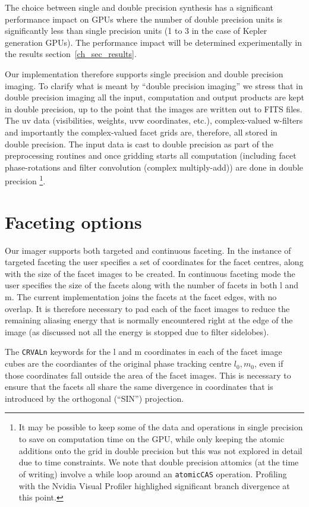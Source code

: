 The choice between single and double precision synthesis has a significant performance impact on GPUs where the number of double precision units is significantly
less than single precision units (1 to 3 in the case of Kepler generation GPUs). The performance impact will be determined experimentally in the results 
section~\ref{ch_sec_results}.

Our implementation therefore supports single precision and double precision imaging. To clarify what is meant by ``double precision imaging'' we stress that in
double precision imaging all the input, computation and output products are kept in double precision, up to the point that the images are written out to FITS files. 
The uv data (visibilities, weights, uvw coordinates, etc.), complex-valued w-filters and importantly the complex-valued facet grids are, therefore, all stored in double precision. 
The input data is cast to double precision as part of the preprocessing routines and once gridding starts all computation (including
facet phase-rotations and filter convolution (complex multiply-add)) are done in double precision \footnote{It may be possible to keep some of the 
data and operations in single precision to save on computation time on the GPU, while only keeping the atomic additions onto the grid in double precision but this was not 
explored in detail due to time constraints. We note that double precision attomics (at the time of writing) involve a while loop around an \texttt{atomicCAS} operation. 
Profiling with the Nvidia Visual Profiler highlighed significant branch divergence at this point.}.
\section{Faceting options}
Our imager supports both targeted and continuous faceting. In the instance of targeted faceting the user specifies a set of coordinates 
for the facet centres, along with the size of the facet images to be created. In continuous faceting mode the user specifies the size of the facets along with the number of facets in
both l and m. The current implementation joins the facets at the facet edges, with no overlap. It is therefore necessary to pad each of the facet images to
reduce the remaining aliasing energy that is normally encountered right at the edge of the image (as discussed not all the energy is stopped due to filter sidelobes).

The \texttt{CRVALn} keywords for the l and m coordinates in each of the facet image cubes are the coordiantes of the original phase tracking centre $l_0,m_0$, even
if those coordinates fall outside the area of the facet images. This is necessary to ensure that the facets all share the same divergence in coordinates that is introduced by the
orthogonal (``SIN'') projection.

